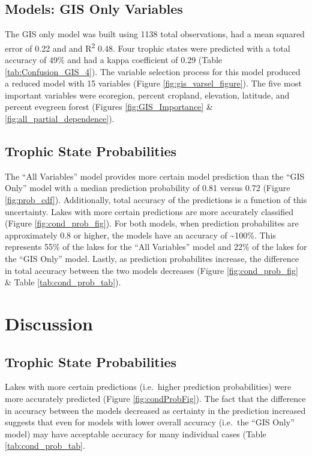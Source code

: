 \documentclass[11pt,]{article}
\begin{document}
\subsection{Models: GIS Only Variables}\label{models-gis-only-variables}

The GIS only model was built using 1138 total observations, had a mean
squared error of 0.22 and and R\textsuperscript{2} 0.48. Four trophic
states were predicted with a total accuracy of 49\% and had a kappa
coefficient of 0.29 (Table \ref{tab:Confusion_GIS_4}). The variable
selection process for this model produced a reduced model with 15
variables (Figure \ref{fig:gis_varsel_figure}). The five most important
variables were ecoregion, percent cropland, elevation, latitude, and
percent evegreen forest (Figures \ref{fig:GIS_Importance} \&
\ref{fig:all_partial_dependence}).

\subsection{Trophic State
Probabilities}\label{trophic-state-probabilities-1}

The ``All Variables'' model provides more certain model prediction than
the ``GIS Only'' model with a median prediction probability of 0.81
versus 0.72 (Figure \ref{fig:prob_cdf}). Additionally, total accuracy of
the predictions is a function of this uncertainty. Lakes with more
certain predictions are more accurately classified (Figure
\ref{fig:cond_prob_fig}). For both models, when prediction probabilites
are approximately 0.8 or higher, the models have an accuracy of
\textasciitilde{}100\%. This represents 55\% of the lakes for the ``All
Variables'' model and 22\% of the lakes for the ``GIS Only'' model.
Lastly, as prediction probabilites increase, the difference in total
accuracy between the two models decreases (Figure
\ref{fig:cond_prob_fig} \& Table \ref{tab:cond_prob_tab}).

\section{Discussion}\label{discussion}

\subsection{Trophic State
Probabilities}\label{trophic-state-probabilities-2}

Lakes with more certain predictions (i.e.~higher prediction
probabilities) were more accurately predicted (Figure
\ref{fig:condProbFig}). The fact that the difference in accuracy between
the models decreased as certainty in the prediction increased suggests
that even for models with lower overall accuracy (i.e.~the ``GIS Only''
model) may have acceptable accuracy for many individual cases (Table
\ref{tab:cond_prob_tab}.
\end{document}

